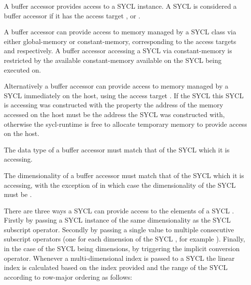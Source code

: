 A buffer accessor provides access to a SYCL  instance. A SYCL  is considered a buffer accessor if it has the access
target ,  or .

A buffer accessor can provide access to memory managed by a SYCL  class via either \gls{global-memory} or \gls{constant-memory},
corresponding to the access targets 
and  respectively. A buffer accessor
accessing a SYCL  via \gls{constant-memory} is restricted by
the available \gls{constant-memory} available on the SYCL 
being executed on.

Alternatively a buffer accessor can provide access to memory managed by a SYCL
 immediately on the \gls{host}, using the access target
. If the SYCL  this
SYCL  is accessing was constructed with the property 
 the address of the memory accessed
on the \gls{host} must be the address the SYCL  was
constructed with, otherwise the \gls{sycl-runtime} is free to allocate temporary
memory to provide access on the \gls{host}.

The data type of a buffer accessor must match that of the SYCL  which it is accessing.

The dimensionality of a buffer accessor must match that of the SYCL  which it is accessing, with the exception of  in which
case the dimensionality of the SYCL  must be .

There are three ways a SYCL  can provide access to the
elements of a SYCL . Firstly by passing a SYCL  instance of the same dimensionality as the SYCL 
subscript operator. Secondly by passing a single  value to
multiple consecutive subscript operators (one for each dimension of the SYCL
, for example ). Finally, in the
case of the SYCL  being  dimensions, by
triggering the implicit conversion operator. Whenever a multi-dimensional index
is passed to a SYCL  the linear index is calculated based
on the index  provided and the range of the SYCL
  according to row-major
ordering as follows:

